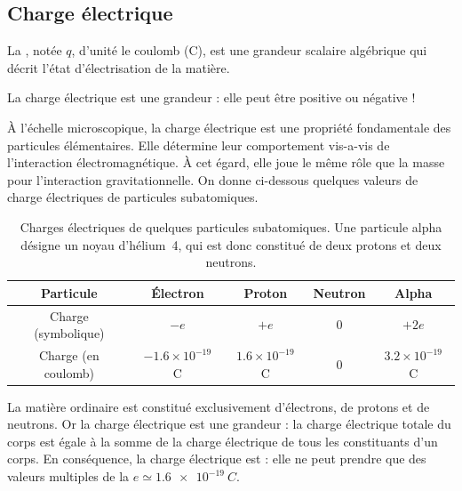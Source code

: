 \documentclass[12pt,fancy]{cours}
\begin{document}
\subsection{Charge électrique}

\begin{definition}\label{def:}
La , notée $q$, d’unité le coulomb (C), est une grandeur scalaire algébrique qui décrit l'état d'électrisation de la matière.
\end{definition}
\begin{remarque}
La charge électrique est une grandeur  : elle peut être positive ou négative ! 
\end{remarque} 
 
 À l’échelle microscopique, la charge électrique est une propriété fondamentale des particules élémentaires. Elle détermine leur comportement vis-a-vis de l'interaction électromagnétique.
À cet égard, elle joue le même rôle que la masse pour l'interaction gravitationnelle. On donne ci-dessous quelques valeurs de charge électriques de particules subatomiques.

\begin{table}[h]
\centering
\begin{tabular}{|c|c|c|c|c|}
\hline
Particule &
Électron & Proton & Neutron & Alpha \\
\hline
Charge (symbolique) & 
$-e$ & $+e$ & $0$ & $+2e$ \\
\hline
Charge (en coulomb) &
$-1.6 \times 10^{-19}$ C & $1.6 \times 10^{-19}$ C & $0$ & $3.2 \times 10^{-19}$ C \\
\hline
\end{tabular}
\caption{Charges électriques de quelques particules subatomiques. Une particule alpha désigne un noyau d'hélium~4, qui est donc constitué de deux protons et deux neutrons.}
\end{table}

La matière ordinaire est constitué exclusivement d’électrons, de protons et de neutrons. Or la charge électrique est une grandeur  : la charge électrique totale du corps est égale à la somme de la charge électrique de tous les constituants d’un corps. En conséquence, la charge électrique est  : elle ne peut prendre que des valeurs multiples de la  $e\simeq\SI{1,6e-19}{C}.$
\end{document}
